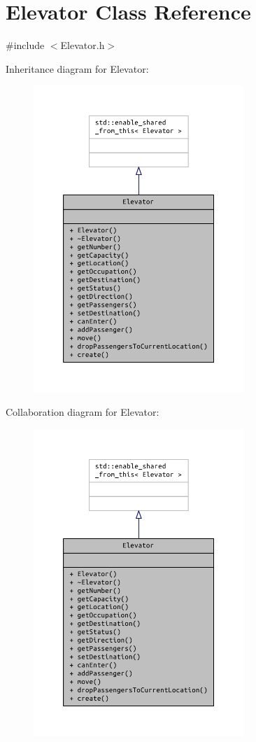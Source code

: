\section{Elevator Class Reference}
\label{class_elevator}


{\ttfamily \#include $<$Elevator.\+h$>$}



Inheritance diagram for Elevator\+:
\nopagebreak
\begin{figure}[H]
\begin{center}
\leavevmode
\includegraphics[width=226pt]{class_elevator__inherit__graph}
\end{center}
\end{figure}


Collaboration diagram for Elevator\+:
\nopagebreak
\begin{figure}[H]
\begin{center}
\leavevmode
\includegraphics[width=226pt]{class_elevator__coll__graph}
\end{center}
\end{figure}

